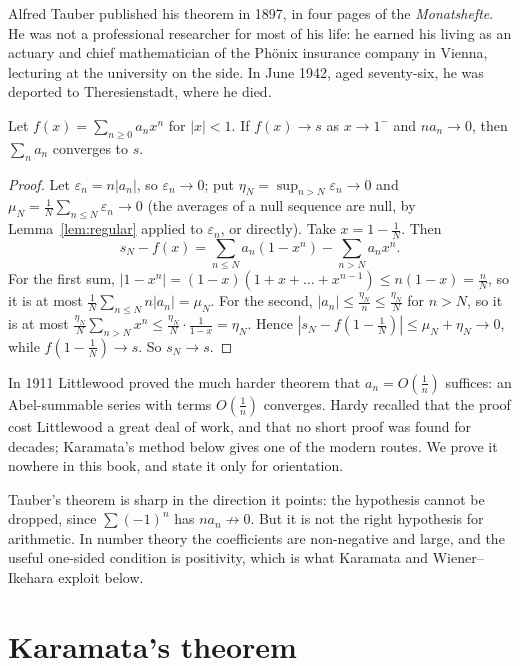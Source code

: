Alfred Tauber published his theorem in 1897, in four pages of the \emph{Monatshefte}. He was not a professional researcher for most of his life: he
earned his living as an actuary and chief mathematician of the Ph\"onix insurance company in Vienna, lecturing at the university on the side. In June 1942,
aged seventy-six, he was deported to Theresienstadt, where he died.

\begin{theorem}[Tauber, 1897]\label{thm:tauber}
Let $f(x)=\sum_{n\ge0}a_nx^n$ for $|x|<1$. If $f(x)\to s$ as $x\to1^-$ and $na_n\to0$, then $\sum_na_n$ converges to $s$.
\end{theorem}
\begin{proof}
Let $\varepsilon_n=n|a_n|$, so $\varepsilon_n\to0$; put $\eta_N=\sup_{n>N}\varepsilon_n\to0$ and $\mu_N=\frac1N\sum_{n\le N}\varepsilon_n\to0$ (the averages of a null
sequence are null, by Lemma~\ref{lem:regular} applied to $\varepsilon_n$, or directly). Take $x=1-\frac1N$. Then
\[
s_N-f(x)=\sum_{n\le N}a_n(1-x^n)-\sum_{n>N}a_nx^n.
\]
For the first sum, $|1-x^n|=(1-x)(1+x+\dots+x^{n-1})\le n(1-x)=\frac nN$, so it is at most $\frac1N\sum_{n\le N}n|a_n|=\mu_N$. For the second,
$|a_n|\le\frac{\eta_N}n\le\frac{\eta_N}N$ for $n>N$, so it is at most $\frac{\eta_N}N\sum_{n>N}x^n\le\frac{\eta_N}N\cdot\frac1{1-x}=\eta_N$. Hence
$|s_N-f(1-\frac1N)|\le\mu_N+\eta_N\to0$, while $f(1-\frac1N)\to s$. So $s_N\to s$.
\end{proof}

\begin{remark}
In 1911 Littlewood proved the much harder theorem that $a_n=O(\frac1n)$ suffices: an Abel-summable series with terms $O(\frac1n)$ converges. Hardy
recalled that the proof cost Littlewood a great deal of work, and that no short proof was found for decades; Karamata's method below gives one of the
modern routes. We prove it nowhere in this book, and state it only for orientation.
\end{remark}

\begin{remark}
Tauber's theorem is sharp in the direction it points: the hypothesis cannot be dropped, since $\sum(-1)^n$ has $na_n\not\to0$. But it is not the right
hypothesis for arithmetic. In number theory the coefficients are non-negative and large, and the useful one-sided condition is positivity, which is what
Karamata and Wiener--Ikehara exploit below.
\end{remark}

\section{Karamata's theorem}

